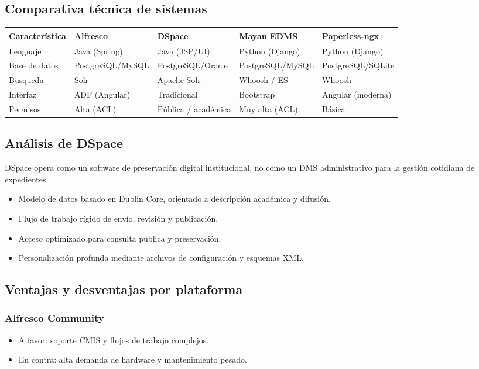 \subsection{Comparativa técnica de sistemas}
\begin{longtable}{p{} p{} p{} p{} p{}}
\toprule
\textbf{Característica} & \textbf{Alfresco} & \textbf{DSpace} & \textbf{Mayan EDMS} & \textbf{Paperless-ngx} \\
\midrule
Lenguaje & Java (Spring) & Java (JSP/UI) & Python (Django) & Python (Django) \\
Base de datos & PostgreSQL/MySQL & PostgreSQL/Oracle & PostgreSQL/MySQL & PostgreSQL/SQLite \\
Busqueda & Solr & Apache Solr & Whoosh / ES & Whoosh \\
Interfaz & ADF (Angular) & Tradicional & Bootstrap & Angular (moderna) \\
Permisos & Alta (ACL) & Pública / académica & Muy alta (ACL) & Básica \\
\bottomrule
\end{longtable}

\subsection{Análisis de DSpace}
DSpace opera como un software de preservación digital institucional, no como un DMS administrativo para la gestión cotidiana de expedientes.

\begin{itemize}
  \item Modelo de datos basado en Dublin Core, orientado a descripción académica y difusión.
  \item Flujo de trabajo rígido de envío, revisión y publicación.
  \item Acceso optimizado para consulta pública y preservación.
  \item Personalización profunda mediante archivos de configuración y esquemas XML.
\end{itemize}

\subsection{Ventajas y desventajas por plataforma}
\subsubsection{Alfresco Community}
\begin{itemize}
  \item A favor: soporte CMIS y flujos de trabajo complejos.
  \item En contra: alta demanda de hardware y mantenimiento pesado.
\end{itemize}

